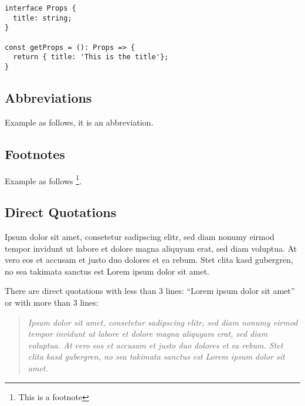 \begin{lstlisting}
interface Props {
  title: string;
}

const getProps = (): Props => {
  return { title: 'This is the title'};
}
\end{lstlisting}

\subsection{Abbreviations}

Example as follows, \gls{it} is an abbreviation.

\subsection{Footnotes}

Example as follows \footnote{This is a footnote}.

\subsection{Direct Quotations}

Ipsum dolor sit amet, consetetur sadipscing elitr, sed diam nonumy eirmod tempor invidunt ut labore et dolore magna aliquyam erat, sed diam voluptua. At vero eos et accusam et justo duo dolores et ea rebum. Stet clita kasd gubergren, no sea takimata sanctus est Lorem ipsum dolor sit amet. \cite{wiki}

There are direct quotations with less than 3 lines: \enquote{Lorem ipsum dolor sit amet} \cite{wiki} or with more than 3 lines:

\begin{quote}
  \textit{Ipsum dolor sit amet, consetetur sadipscing elitr, sed diam nonumy eirmod tempor invidunt ut labore et dolore magna aliquyam erat, sed diam voluptua. At vero eos et accusam et justo duo dolores et ea rebum. Stet clita kasd gubergren, no sea takimata sanctus est Lorem ipsum dolor sit amet.} \cite{wiki}
\end{quote}

